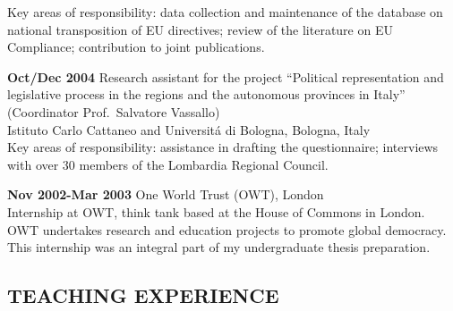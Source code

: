 \documentclass[11pt,]{article}
\renewenvironment{itemize}{
  \begin{list}{}{
    \setlength{\leftmargin}{1.5em}
  }
}{
  \end{list}
}
\begin{document}
\begin{itemize}
  Key areas of responsibility: data collection and maintenance of the
  database on national transposition of EU directives; review of the
  literature on EU Compliance; contribution to joint publications.
\item
  \textbf{Oct/Dec 2004} Research assistant for the project ``Political
  representation and legislative process in the regions and the
  autonomous provinces in Italy'' (Coordinator Prof.~Salvatore
  Vassallo)\\
  Istituto Carlo Cattaneo and Universitá di Bologna, Bologna, Italy\\
  Key areas of responsibility: assistance in drafting the questionnaire;
  interviews with over 30 members of the Lombardia Regional Council.
\item
  \textbf{Nov 2002-Mar 2003} One World Trust (OWT), London\\
  Internship at OWT, think tank based at the House of Commons in London.
  OWT undertakes research and education projects to promote global
  democracy. This internship was an integral part of my undergraduate
  thesis preparation.
\end{itemize}

\hypertarget{teaching-experience}{%
\subsection{TEACHING EXPERIENCE}\label{teaching-experience}}
\end{document}
